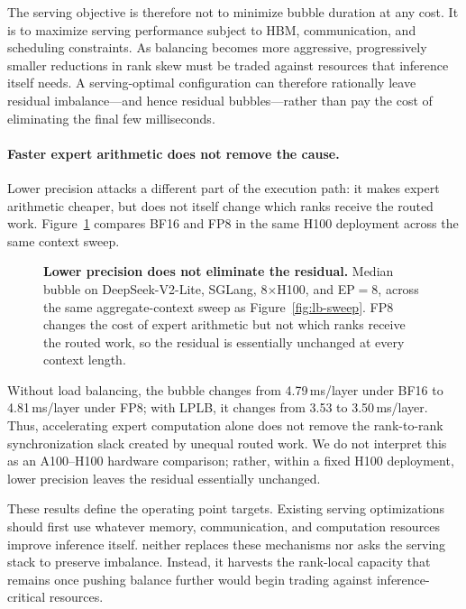 The serving objective is therefore not to minimize bubble duration at
any cost. It is to maximize serving performance subject to HBM,
communication, and scheduling constraints. As balancing becomes more
aggressive, progressively smaller reductions in rank skew must be traded
against resources that inference itself needs. A serving-optimal
configuration can therefore rationally leave residual imbalance---and
hence residual bubbles---rather than pay the cost of eliminating the
final few milliseconds.

\paragraph{Faster expert arithmetic does not remove the cause.}
Lower precision attacks a different part of the execution path: it makes
expert arithmetic cheaper, but does not itself change which ranks receive
the routed work. Figure~\ref{fig:precision-sweep} compares BF16 and FP8
in the same H100 deployment across the same context sweep.

\begin{figure}[t]
  \centering
  \caption{
    \textbf{Lower precision does not eliminate the residual.}
    Median bubble on DeepSeek-V2-Lite, SGLang, 8$\times$H100, and
    \ac{EP}$=8$, across the same aggregate-context sweep as
    Figure~\ref{fig:lb-sweep}. FP8 changes the cost of expert arithmetic but
    not which ranks receive the routed work, so the residual is essentially
    unchanged at every context length.
  }
  \label{fig:precision-sweep}
\end{figure}

Without load balancing, the bubble changes from 4.79\,ms/layer under
BF16 to 4.81\,ms/layer under FP8; with LPLB, it changes from
3.53 to 3.50\,ms/layer. Thus, accelerating expert computation alone
does not remove the rank-to-rank synchronization slack created by
unequal routed work. We do not interpret this as an A100--H100 hardware
comparison; rather, within a fixed H100 deployment, lower precision
leaves the residual essentially unchanged.

These results define the operating point \sys{} targets. Existing
serving optimizations should first use whatever memory, communication,
and computation resources improve inference itself. \sys{} neither
replaces these mechanisms nor asks the serving stack to preserve
imbalance. Instead, it harvests the rank-local capacity that remains
once pushing balance further would begin trading against
inference-critical resources.

